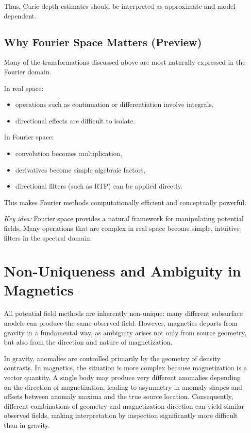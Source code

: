 Thus, Curie depth estimates should be interpreted as approximate and model-dependent.

\subsection{Why Fourier Space Matters (Preview)}

Many of the transformations discussed above are most naturally expressed in the Fourier domain.

In real space:
\begin{itemize}
    \item operations such as continuation or differentiation involve integrals,
    \item directional effects are difficult to isolate.
\end{itemize}

In Fourier space:
\begin{itemize}
    \item convolution becomes multiplication,
    \item derivatives become simple algebraic factors,
    \item directional filters (such as RTP) can be applied directly.
\end{itemize}

This makes Fourier methods computationally efficient and conceptually powerful.

\emph{Key idea:} Fourier space provides a natural framework for manipulating potential fields. Many operations that are complex in real space become simple, intuitive filters in the spectral domain.

\section{Non-Uniqueness and Ambiguity in Magnetics}

All potential field methods are inherently non-unique: many different subsurface models can produce the same observed field. However, magnetics departs from gravity in a fundamental way, as ambiguity arises not only from source geometry, but also from the direction and nature of magnetization.

In gravity, anomalies are controlled primarily by the geometry of density contrasts. In magnetics, the situation is more complex because magnetization is a vector quantity. A single body may produce very different anomalies depending on the direction of magnetization, leading to asymmetry in anomaly shapes and offsets between anomaly maxima and the true source location. Consequently, different combinations of geometry and magnetization direction can yield similar observed fields, making interpretation by inspection significantly more difficult than in gravity.


